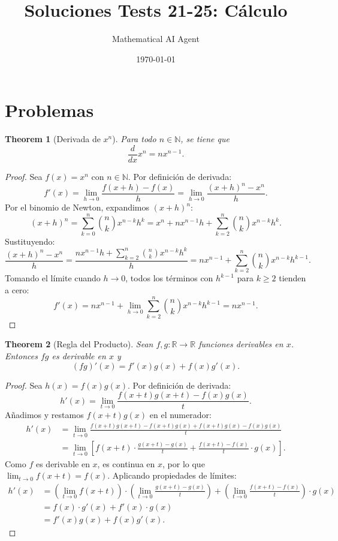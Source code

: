 \documentclass[11pt,a4paper]{article}
\title{Soluciones Tests 21-25: Cálculo}
\author{Mathematical AI Agent}
\date{\today}
\theoremstyle{plain}
\newtheorem{theorem}{Theorem}[section]
\theoremstyle{definition}
\begin{document}
\maketitle
\section{Problemas}

\begin{theorem}[Derivada de $x^n$]\label{thm:derivada-xn}
Para todo $n \in \mathbb{N}$, se tiene que
\[
\frac{d}{dx}x^n = nx^{n-1}.
\]
\end{theorem}

\begin{proof}
Sea $f(x) = x^n$ con $n \in \mathbb{N}$. Por definición de derivada:
\[
f'(x) = \lim_{h \to 0} \frac{f(x+h) - f(x)}{h} = \lim_{h \to 0} \frac{(x+h)^n - x^n}{h}.
\]
Por el binomio de Newton, expandimos $(x+h)^n$:
\[
(x+h)^n = \sum_{k=0}^{n} \binom{n}{k} x^{n-k} h^k = x^n + nx^{n-1}h + \sum_{k=2}^{n} \binom{n}{k} x^{n-k} h^k.
\]
Sustituyendo:
\[
\frac{(x+h)^n - x^n}{h} = \frac{nx^{n-1}h + \sum_{k=2}^{n} \binom{n}{k} x^{n-k} h^k}{h} = nx^{n-1} + \sum_{k=2}^{n} \binom{n}{k} x^{n-k} h^{k-1}.
\]
Tomando el límite cuando $h \to 0$, todos los términos con $h^{k-1}$ para $k \geq 2$ tienden a cero:
\[
f'(x) = nx^{n-1} + \lim_{h \to 0} \sum_{k=2}^{n} \binom{n}{k} x^{n-k} h^{k-1} = nx^{n-1}.
\]
\end{proof}

\begin{theorem}[Regla del Producto]\label{thm:producto}
Sean $f, g: \mathbb{R} \to \mathbb{R}$ funciones derivables en $x$. Entonces $fg$ es derivable en $x$ y
\[
(fg)'(x) = f'(x)g(x) + f(x)g'(x).
\]
\end{theorem}

\begin{proof}
Sea $h(x) = f(x)g(x)$. Por definición de derivada:
\[
h'(x) = \lim_{t \to 0} \frac{f(x+t)g(x+t) - f(x)g(x)}{t}.
\]
Añadimos y restamos $f(x+t)g(x)$ en el numerador:
\begin{align*}
h'(x) &= \lim_{t \to 0} \frac{f(x+t)g(x+t) - f(x+t)g(x) + f(x+t)g(x) - f(x)g(x)}{t} \\
&= \lim_{t \to 0} \left[ f(x+t) \cdot \frac{g(x+t) - g(x)}{t} + \frac{f(x+t) - f(x)}{t} \cdot g(x) \right].
\end{align*}
Como $f$ es derivable en $x$, es continua en $x$, por lo que $\lim_{t \to 0} f(x+t) = f(x)$. Aplicando propiedades de límites:
\begin{align*}
h'(x) &= \left(\lim_{t \to 0} f(x+t)\right) \cdot \left(\lim_{t \to 0} \frac{g(x+t) - g(x)}{t}\right) + \left(\lim_{t \to 0} \frac{f(x+t) - f(x)}{t}\right) \cdot g(x) \\
&= f(x) \cdot g'(x) + f'(x) \cdot g(x) \\
&= f'(x)g(x) + f(x)g'(x).
\end{align*}
\end{proof}
\end{document}
